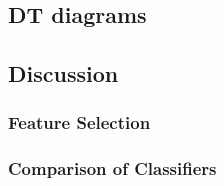 \subsection{DT diagrams}
\begin{obeylines}
    
    
\end{obeylines}

\subsection{Discussion}

\subsubsection{Feature Selection}


\subsubsection{Comparison of Classifiers}



